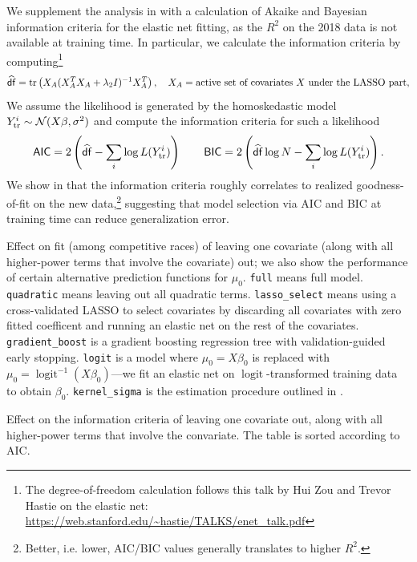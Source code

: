\documentclass[12pt]{article}
\newcommand{\logit}{\operatorname{logit}}
\begin{document}
We supplement the analysis in  with a calculation of Akaike and Bayesian information criteria for the elastic net fitting, as the $R^2$ on the 2018 data is not available at training time. In particular, we calculate the information criteria by computing\footnote{The degree-of-freedom calculation follows this talk by Hui Zou and Trevor Hastie on the elastic net: \url{https://web.stanford.edu/~hastie/TALKS/enet_talk.pdf}} \[
\widehat {\mathsf{df}} = \operatorname{tr}\left({X_A (X_A^T X_A + \lambda_2 I)^{-1} X_A^T}\right), \quad X_A = \text{active set of covariates $X$ under the LASSO part},
\] 
We assume the likelihood is generated by the homoskedastic model $Y^i_{\text{tr}} \sim \mathcal{N}(X\beta, \sigma^2)$ and compute the information criteria for such a likelihood\begin{align*}
\mathsf{AIC} = 2 \left({\widehat {\mathsf{df}} - \sum_i \log 
L(Y_\text{tr}^i)}\right) \qquad \mathsf{BIC} = 2 \left({\widehat {\mathsf{df}} \log N - \sum_i \log 
L(Y_\text{tr}^i) }\right).
\end{align*}
We show in  that the information criteria roughly correlates to realized goodness-of-fit on the new data,\footnote{Better, i.e. lower, AIC/BIC values generally translates to higher $R^2$.} suggesting that model selection via AIC and BIC at training time can reduce generalization error. 

\begin{table}[tb]
  \caption{Effect on fit (among competitive races) of leaving one covariate (along with all higher-power terms that involve the covariate) out; we also show the performance of certain alternative prediction functions for $\mu_0$. \texttt{full} means full model. \texttt{quadratic} means leaving out all quadratic terms. \texttt{lasso\_select} means using a cross-validated LASSO to select covariates by discarding all covariates with zero fitted coefficent and running an elastic net on the rest of the covariates. \texttt{gradient\_boost} is a gradient boosting regression tree with validation-guided early stopping. \texttt{logit} is a model where $\mu_0 = X\beta_0$ is replaced with $\mu_0 = \logit^{-1}(X\beta_0)$---we fit an elastic net on $\logit$-transformed training data to obtain $\beta_0$. \texttt{kernel\_sigma} is the estimation procedure outlined in .}
  \label{tab:leave_out}
  \centering
  \vspace{.4em}
  
\end{table}

\begin{table}[tb]
  \caption{Effect on the information criteria of leaving one covariate out, along with all higher-power terms that involve the convariate. The table is sorted according to AIC.}
  \label{tab:ic}
  \centering
  \vspace{.4em}
  
\end{table}
\end{document}
